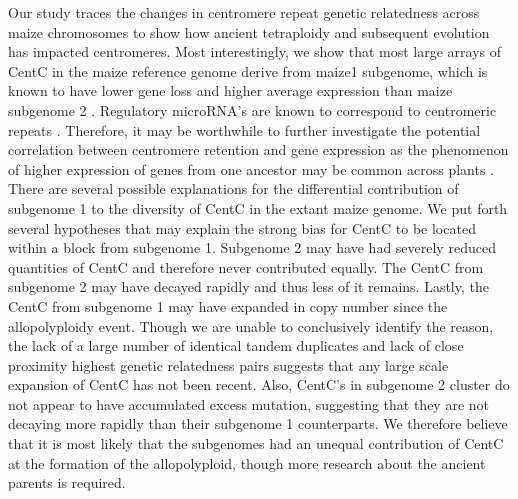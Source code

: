 Our study traces the changes in centromere repeat genetic relatedness across maize chromosomes to show how ancient tetraploidy and subsequent evolution has impacted centromeres.  Most interestingly, we show that most large arrays of CentC in the maize reference genome derive from maize1 subgenome, which is known to have lower gene loss and higher average expression than maize subgenome 2 \cite{Schnable2011}.  Regulatory microRNA’s are known to correspond to centromeric repeats \citep{ReinhartBartel2002}.  Therefore, it may be worthwhile to further investigate the potential correlation between centromere retention and gene expression as the phenomenon of higher expression of genes from one ancestor may be common across plants \citep{Cheng2012}.  There are several possible explanations for the differential contribution of subgenome 1 to the diversity of CentC in the extant maize  genome. We put forth several hypotheses that may explain the strong bias for CentC to be located within a block from subgenome 1. Subgenome 2 may have had severely reduced quantities of CentC and therefore never contributed equally.  The CentC from subgenome 2 may have decayed rapidly and thus less of it remains.  Lastly, the CentC from subgenome 1 may have expanded in copy number since the allopolyploidy event.  Though we are unable to conclusively identify the reason, the lack of a large number of identical tandem duplicates  and lack of close proximity highest genetic relatedness pairs suggests that any large scale expansion of CentC has not been recent.  Also, CentC’s in subgenome 2 cluster do not appear to have accumulated excess mutation, suggesting that they are not decaying more rapidly than their subgenome 1 counterparts.  We therefore believe that it is most likely that the subgenomes had an unequal contribution of CentC at the formation of the allopolyploid, though more research about the ancient parents is required.  


